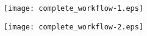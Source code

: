 \documentclass{article}
\begin{document}

\begin{figure}[htbp]
  \centering
  \texttt{[image: complete\_workflow-1.eps]}
\end{figure}
\newpage
\begin{figure}[htbp]
  \centering
  \texttt{[image: complete\_workflow-2.eps]}
\end{figure}
\end{document}
